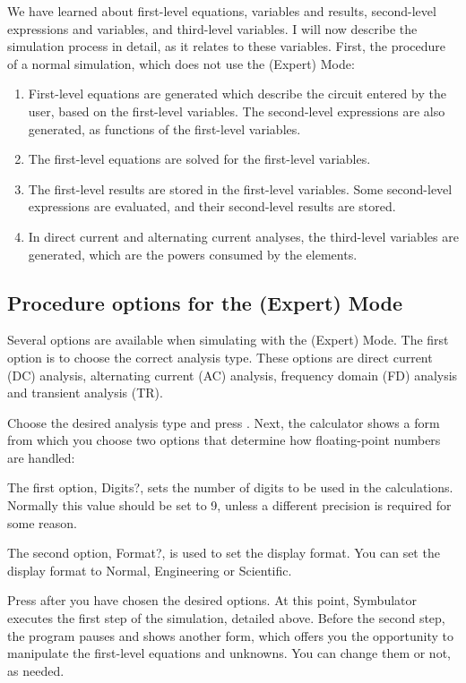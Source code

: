 We have learned about first-level equations, variables and results,
second-level expressions and variables, and third-level variables. I
will now describe the simulation process in detail, as it relates to
these variables. First, the procedure of a normal simulation, which
does not use the (Expert) Mode:

\begin{enumerate}
\item First-level equations are generated which describe the circuit
  entered by the user, based on the first-level variables. The
  second-level expressions are also generated, as functions of the
  first-level variables.
\item The first-level equations are solved for the first-level
  variables.
\item The first-level results are stored in the first-level
  variables. Some second-level expressions are evaluated, and their
  second-level results are stored.
\item In direct current and alternating current analyses, the
  third-level variables are generated, which are the powers consumed
  by the elements.
\end{enumerate}

\subsection{Procedure options for the (Expert) Mode}

Several options are available when simulating with the (Expert)
Mode. The first option is to choose the correct analysis type. These
options are direct current (DC) analysis, alternating current (AC)
analysis, frequency domain (FD) analysis and transient analysis
(TR).

Choose the desired analysis type and press . Next, the
calculator shows a form from which you choose two options that
determine how floating-point numbers are handled:

The first option, Digits?, sets the number of digits to be used in
the calculations. Normally this value should be set to 9, unless a
different precision is required for some reason.

The second option, Format?, is used to set the display format. You
can set the display format to Normal, Engineering or Scientific.

Press  after you have chosen the desired options. At this
point, Symbulator executes the first step of the simulation,
detailed above. Before the second step, the program pauses and shows
another form, which offers you the opportunity to manipulate the
first-level equations and unknowns. You can change them or not, as
needed.

